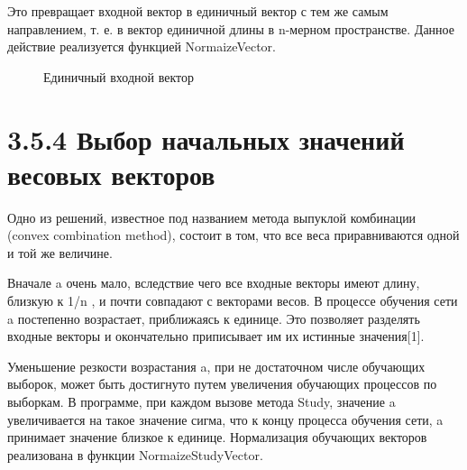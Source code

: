 \documentclass[14pt,a4paper]{extreport}
\begin{document}
   \hspace {4ex} Это превращает входной вектор в единичный вектор с тем же самым направлением, т. е. в вектор единичной длины в n-мерном пространстве. Данное действие реализуется функцией NormaizeVector.\
   
   \begin{figure}[h!]
\caption{Единичный входной вектор}
\end{figure}
   
            \section*{\normalsize\hspace{4ex}3.5.4 Выбор начальных значений весовых векторов}
            
   \hspace {4ex} Одно из решений, известное под названием метода выпуклой комбинации (convex combination method), состоит в том, что все веса приравниваются одной и той же величине.\       
   
   \hspace {4ex} Вначале a очень мало, вследствие чего все входные векторы имеют длину, близкую к 1/n , и почти совпадают с векторами весов. В процессе обучения сети a постепенно возрастает, приближаясь к единице. Это позволяет разделять входные векторы и окончательно приписывает им их истинные значения[1].\ 
   
   \hspace {4ex} Уменьшение резкости возрастания a, при не достаточном числе обучающих выборок, может быть достигнуто путем увеличения обучающих процессов по выборкам. В программе, при каждом вызове метода Study, значение a увеличивается на такое значение сигма, что к концу процесса обучения сети, a принимает значение близкое к единице.
Нормализация обучающих векторов реализована в функции  NormaizeStudyVector.\
\end{document}
